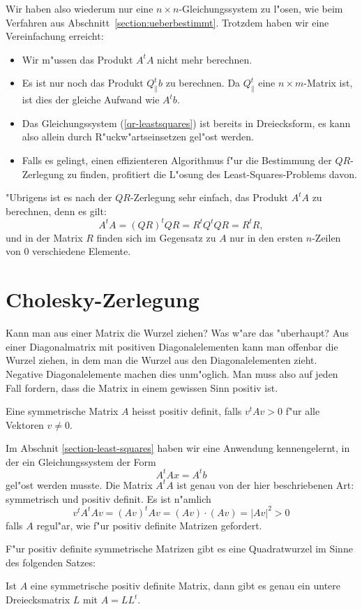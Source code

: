 Wir haben also wiederum nur eine $n\times n$-Gleichungssystem
zu l"osen, wie beim Verfahren aus Abschnitt~\ref{section:ueberbestimmt}.
Trotzdem haben wir eine Vereinfachung erreicht:
\begin{itemize}
\item Wir m"ussen das Produkt $A^tA$ nicht mehr berechnen.
\item Es ist nur noch das Produkt $Q_{\|}^tb$ zu berechnen. Da $Q_{\|}^t$
eine $n\times m$-Matrix ist, ist dies der gleiche Aufwand wie $A^tb$.
\item Das Gleichungssystem (\ref{qr-leastsquares}) ist bereits in Dreiecksform,
es kann also allein durch R"uckw"artseinsetzen gel"ost werden.
\item Falls es gelingt, einen effizienteren Algorithmus f"ur die Bestimmung
der $QR$-Zerlegung zu finden, profitiert die L"osung des Least-Squares-Problems
davon.
\end{itemize}
"Ubrigens ist es nach der $QR$-Zerlegung sehr einfach, das Produkt $A^tA$
zu berechnen, denn es gilt:
\[
A^tA=(QR)^tQR=R^tQ^tQR=R^tR,
\]
und in der Matrix $R$ finden sich im Gegensatz zu $A$
nur in den ersten $n$-Zeilen von $0$ verschiedene Elemente.

\section{Cholesky-Zerlegung}
Kann man aus einer Matrix die Wurzel ziehen? Was w"are das "uberhaupt?
Aus einer Diagonalmatrix mit positiven Diagonalelementen kann man offenbar
die Wurzel ziehen, in dem man die Wurzel aus den Diagonalelementen zieht.
Negative Diagonalelemente machen dies unm"oglich. Man muss also auf jeden
Fall fordern, dass die Matrix in einem gewissen Sinn positiv ist. 

\begin{definition}
Eine symmetrische Matrix $A$ heisst positiv definit, falls $v^tAv>0$ f"ur
alle Vektoren $v\ne 0$.
\end{definition}

Im Abschnit \ref{section-least-squares} haben wir eine Anwendung
kennengelernt, in der ein Gleichungssystem der Form
\[
A^tAx=A^t b
\]
gel"ost werden musste. Die Matrix $A^tA$ ist genau von der hier
beschriebenen Art: symmetrisch und positiv definit. Es ist n"amlich
\[
v^tA^tAv=(Av)^tAv=(Av)\cdot (Av)=|Av|^2> 0
\]
falls $A$ regul"ar, wie f"ur positiv definite Matrizen gefordert.

F"ur positiv definite symmetrische Matrizen gibt es eine Quadratwurzel
im Sinne des folgenden Satzes:
\begin{satz}
Ist $A$ eine symmetrische positiv definite Matrix, dann gibt es genau ein
untere Dreiecksmatrix $L$ mit $A=LL^t$.
\end{satz}


